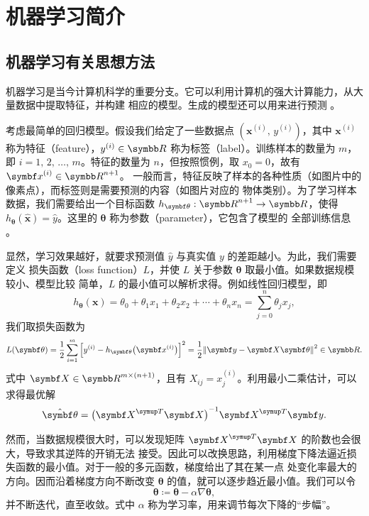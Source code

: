 \chapter{机器学习简介}

\section{机器学习有关思想方法}

机器学习是当今计算机科学的重要分支。它可以利用计算机的强大计算能力，从大量数据中提取特征，并构建
相应的模型。生成的模型还可以用来进行预测 \cite{zhouzhihua,wiki:ml}。

考虑最简单的回归模型。假设我们给定了一些数据点 $(\bm{x}^{(i)}, \, y^{(i)})$，其中 $\bm{x}^{(i)}$
称为特征（feature），$y^{(i)}\in\R$ 称为标签（label）。训练样本的数量为 $m$，即
$i=1,\,2,\,\ldots,\,m$。特征的数量为 $n$，但按照惯例，取 $x_0=0$，故有 $\bm{x}^{(i)}\in\R^{n+1}$。
一般而言，特征反映了样本的各种性质（如图片中的像素点），而标签则是需要预测的内容（如图片对应的
物体类别）。为了学习样本数据，我们需要给出一个目标函数 $h_\bm{\theta}: \R^{n+1}\to\R$，使得
$h_\bm{\theta}(\hat{\bm{x}})=\hat{y}$。这里的 $\bm{\theta}$ 称为参数（parameter），它包含了模型的
全部训练信息 \cite{zhouzhihua,tensorflow}。

显然，学习效果越好，就要求预测值 $\hat{y}$ 与真实值 $y$ 的差距越小。为此，我们需要定义
损失函数（loss function）$L$，并使 $L$ 关于参数 $\bm{\theta}$ 取最小值。如果数据规模较小、模型比较
简单，$L$ 的最小值可以解析求得。例如线性回归模型，即
\begin{equation}
  h_\bm{\theta} (\bm{x})
  = \theta_0 + \theta_1 x_1 + \theta_2 x_2 + \cdots + \theta_n x_n
  = \sum_{j=0}^n \theta_j x_j,
\end{equation}
我们取损失函数为
\begin{equation}
  \label{eq:loss-function-linear}
  L(\bm{\theta})
  = \frac{1}{2} \sum_{i=1}^m \qty\Big[y^{(i)} - h_\bm{\theta}\qty\big(\bm{x}^{(i)})]^2
  = \frac{1}{2} \norm{\bm{y} - \bm{X}\bm{\theta}}^2 \in \R.
\end{equation}
式中 $\bm{X}\in\R^{m\times(n+1)}$，且有 $X_{ij} = x^{(i)}_j$。利用最小二乘估计，可以求得最优解
\cite{zhouzhihua}
\begin{equation}
  \hat{\bm{\theta}} = \qty\big(\bm{X}^\trans\bm{X})^{-1} \bm{X}^\trans \bm{y}.
\end{equation}

然而，当数据规模很大时，可以发现矩阵 $\bm{X}^\trans\bm{X}$ 的阶数也会很大，导致求其逆阵的开销无法
接受。因此可以改换思路，利用梯度下降法逼近损失函数的最小值。对于一般的多元函数，梯度给出了其在某一点
处变化率最大的方向。因而沿着梯度方向不断改变 $\bm{\theta}$ 的值，就可以逐步趋近最小值。我们可以令
\begin{equation}
  \bm{\theta} \coloneq \bm{\theta} - \alpha\nabla\bm{\theta},
\end{equation}
并不断迭代，直至收敛。式中 $\alpha$ 称为学习率，用来调节每次下降的“步幅”。

